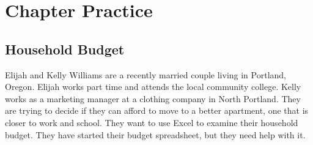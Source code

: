 \section{Chapter Practice}

\subsection{Household Budget}

Elijah and Kelly Williams are a recently married couple living in Portland, Oregon. Elijah works part time and attends the local community college. Kelly works as a marketing manager at a clothing company in North Portland. They are trying to decide if they can afford to move to a better apartment, one that is closer to work and school. They want to use Excel to examine their household budget. They have started their budget spreadsheet, but they need help with it.


